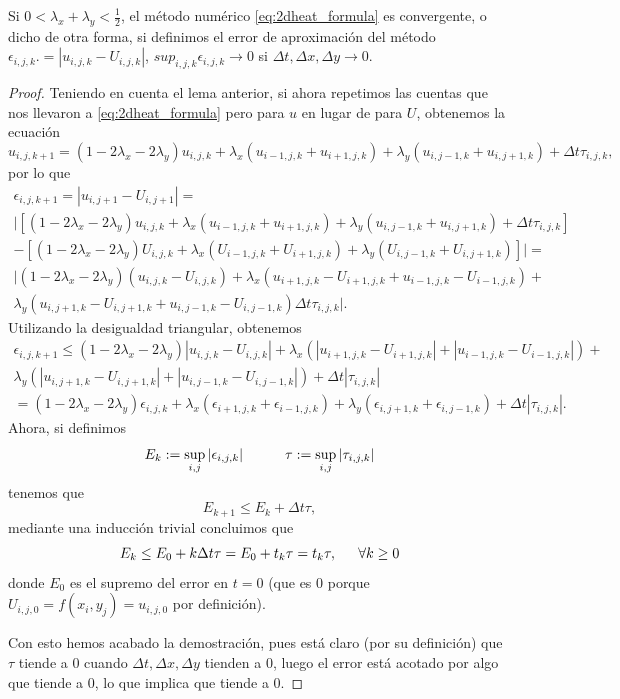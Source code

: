 \begin{teorema}
	Si $0<\lambda_x + \lambda_y<\frac{1}{2}$, el método numérico \eqref{eq:2dheat_formula} es convergente, o dicho de otra forma, si definimos el error de aproximación del método $\epsilon_{i,j,k}.=|u_{i,j,k}-U_{i,j,k}|$, $sup_{i,j,k}\epsilon_{i,j,k}\rightarrow 0$ si $\Delta t,\Delta x,\Delta y \rightarrow 0$.
\end{teorema}
\begin{proof}
	Teniendo en cuenta el lema anterior, si ahora repetimos las cuentas que nos llevaron a \eqref{eq:2dheat_formula} pero para $u$ en lugar de para $U$, obtenemos la ecuación
	\begin{equation}
		u_{i,j,k+1} = (1-2\lambda_x -2\lambda_y) u_{i,j,k}+ \lambda_x(u_{i-1,j,k}+u_{i+1,j,k}) + \lambda_y(u_{i,j-1,k} +u_{i,j+1,k}) +\Delta t\tau_{i,j,k},
	\end{equation}
	por lo que
	\begin{gather}
		\epsilon_{i,j,k+1} = |u_{i,j+1}-U_{i,j+1}| = \\ |\left[(1-2\lambda_x-2\lambda_y)u_{i,j,k}+\lambda_x(u_{i-1,j,k}+u_{i+1,j,k})+ \lambda_y(u_{i,j-1,k} +u_{i,j+1,k}) + \Delta t\tau_{i,j,k}\right] \\ 
		- \left[(1-2\lambda_x-2\lambda_y) U_{i,j,k}+\lambda_x(U_{i-1,j,k}+U_{i+1,j,k}) + \lambda_y(U_{i,j-1,k} +U_{i,j+1,k})\right]| = \\
		|(1-2\lambda_x -2\lambda_y)(u_{i,j,k}-U_{i,j,k}) +\lambda_x(u_{i+1,j,k}-U_{i+1,j,k}+u_{i-1,j,k}-U_{i-1,j,k}) + \\ 
		\lambda_y(u_{i,j+1,k}-U_{i,j+1,k}+u_{i,j-1,k}-U_{i,j-1,k})
		\Delta t\tau_{i,j,k}|.
	\end{gather}
	Utilizando la desigualdad triangular, obtenemos
	\begin{multline}
		\epsilon_{i,j,k+1} \leq (1-2\lambda_x-2\lambda_y)|u_{i,j,k}-U_{i,j,k}|+\lambda_x(|u_{i+1,j,k}-U_{i+1,j,k}|+|u_{i-1,j,k}-U_{i-1,j,k}|) + \\ \lambda_y(|u_{i,j+1,k}-U_{i,j+1,k}|+|u_{i,j-1,k}-U_{i,j-1,k}|) + \Delta t|\tau_{i,j,k}| \\
		= (1-2\lambda_x-2\lambda_y)\epsilon_{i,j,k}+\lambda_x(\epsilon_{i+1,j,k}+\epsilon_{i-1,j,k}) +\lambda_y(\epsilon_{i,j+1,k}+\epsilon_{i,j-1,k}) + \Delta t|\tau_{i,j,k}|.
	\end{multline}
	Ahora, si definimos
	\begin{equation}
		E_k:=\sup_{i,j}|\epsilon_{i,j,k}|\hspace{30px}\tau:=\sup_{i,j}|\tau_{i,j,k}|
	\end{equation}
	tenemos que
	\begin{equation}
		E_{k+1}\leq E_k+\Delta t\tau,
	\end{equation}
	mediante una inducción trivial concluimos que
	\begin{equation}
		E_k \leq E_0 + k\Delta t\tau = E_0+t_k\tau = t_k\tau,\hspace{15px}\forall k\geq0
	\end{equation}
	donde $E_0$ es el supremo del error en $t=0$ (que es $0$ porque $U_{i,j,0} =f(x_i,y_j)= u_{i,j,0}$ por definición).
	
	Con esto hemos acabado la demostración, pues está claro (por su definición) que $\tau$ tiende a 0 cuando $\Delta t, \Delta x, \Delta y$ tienden a 0, luego el error está acotado por algo que tiende a 0, lo que implica que tiende a 0.
\end{proof}